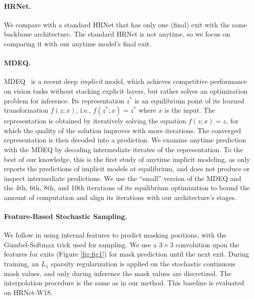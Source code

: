 \paragraph{HRNet.} We compare with a standard HRNet that has only one (final) exit with the same backbone architecture.
The standard HRNet is not anytime, so we focus on comparing it with our anytime model's final exit.

\paragraph{MDEQ.} MDEQ~\cite{bai2020multiscale} is a recent deep \emph{implicit} model, which achieves competitive performance on vision tasks without stacking explicit layers, but rather solves an optimization problem for inference. 
Its representation $z^*$ is an equilibrium point of its learned transformation $f(z; x)$, i.e., $f(z^*; x) = z^*$ where $x$ is the input.
The representation is obtained by iteratively solving the equation $f(z; x) = z$, for which the quality of the solution improves with more iterations.
The converged representation is then decoded into a prediction.
We examine anytime prediction with the MDEQ by decoding intermediate iterates of the representation. 
To the best of our knowledge, this is the first study of anytime implicit modeling, as \cite{bai2020multiscale} only reports the predictions of implicit models at equilibrium, and does not produce or inspect intermediate predictions.
We use the ``small'' version of the MDEQ \cite{bai2020multiscale} and the 4th, 6th, 8th, and 10th iterations of its equilibrium optimization to bound the amount of computation and align its iterations with our architecture's stages. 

\paragraph{Feature-Based Stochastic Sampling.} We follow \cite{xie2020spatially} in using internal features to predict masking positions, with the Gumbel-Softmax trick \cite{jang2016categorical} used for sampling. We use a $3\times3$ convolution upon the features for exits (Figure \ref{fig:fig1}) for mask prediction until the next exit. During training, an $L_1$ sparsity regularization is applied on the stochastic continuous mask values, and only during inference the mask values are discretized. The interpolation procedure is the same as in our method. This baseline is evaluated on HRNet-W18.

